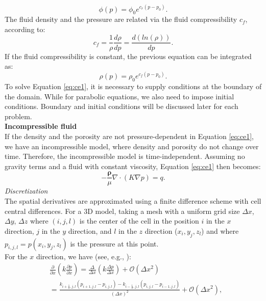 \documentclass[review]{elsarticle}
\begin{document}
\begin{equation}\label{eq:por}
 \phi(p)=\phi_0 e^{c_r(p-p_0)}.
\end{equation}
The fluid density and the pressure are related via the fluid compressibility $c_f$, according to:
\begin{equation*}\label{eq:fc}
 c_f=\frac{1}{\rho}\frac{d\rho}{dp}=\frac{d(ln(\rho))}{dp}.
\end{equation*}
If the fluid compressibility is constant, the previous equation can be integrated as:
\begin{equation}\label{eq:rhoeq}
 \rho(p)=\rho_0 e^{c_f({p}-{p}_0)}.
\end{equation}
To solve Equation \eqref{eq:ce1}, it is necessary to supply conditions at the boundary of the domain. While for parabolic equations, we also need to impose initial conditions. Boundary and initial conditions will be discussed later for each problem.   \\
\textbf{Incompressible fluid}\\
If the density and the porosity are not pressure-dependent in Equation \eqref{eq:ce1}, we have an incompressible model, where density and porosity do not change over time. Therefore, the incompressible model is time-independent. Assuming no gravity terms and a fluid with constant viscosity, Equation \eqref{eq:ce1} then becomes:
\begin{equation}\label{eq:cel}
-\frac{\mathbf{\rho}}{\mu}\nabla \cdot \left({K} \nabla p\right)=q.
\end{equation}
\emph{Discretization}\\
The spatial derivatives are approximated using a finite difference scheme with cell central 
differences. For a 3D model, taking a mesh with a uniform grid size $\Delta x$, $\Delta y$, $\Delta z$ where $(i,j,l)$ is the center 
of the cell
in the position $i$ in the $x$ direction, $j$ in the $y$ direction, and $l$ in the $z$ direction
($x_i,y_j,z_l$) and where $p_{i,j,l}=p(x_i,y_j,z_l)$ is 
the pressure at this point.
\\ For the $x$ direction, we have (see, e.g., \cite{Aziz79,Chen06,Jansen13}):
\begin{align*}
&\frac{\partial}{\partial x}\left(k\frac{\partial p}{\partial x}\right) = 
\frac{\Delta}{\Delta x}\left(k\frac{\Delta p}{\Delta x}\right) +\mathscr{O}(\Delta x^2)\\
&=\frac{ k_{i+\frac{1}{2},j,l}(p_{i+1,j,l}-p_{i,j,l})-k_{i-\frac{1}{2},j,l}(p_{i,j,l}-p_{i-1,j,l})}{\left( \Delta x\right)^2}+\mathscr{O}(\Delta x^2),
\end{align*}
\end{document}

